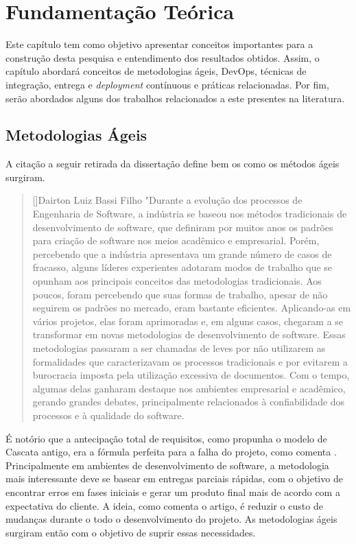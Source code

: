 \chapter{Fundamentação Teórica}

Este capítulo tem como objetivo apresentar conceitos importantes para a
construção desta pesquisa e entendimento dos resultados obtidos. Assim, o capítulo abordará conceitos de metodologias ágeis, DevOps, técnicas de integração, entrega e \emph{deployment} contínuous e práticas relacionadas. Por fim, serão abordados alguns dos trabalhos relacionados a este presentes na literatura.


\section{Metodologias Ágeis}

A citação a seguir retirada da dissertação \cite{experienciaComAgil} define bem os como os métodos ágeis surgiram.

    
\begin{quotation}[]{Dairton Luiz Bassi Filho}
    "Durante a evolução dos processos de Engenharia de Software, a
indústria se baseou nos métodos tradicionais de desenvolvimento de
software, que definiram por muitos anos os padrões para criação de
software nos meios acadêmico e empresarial. Porém, percebendo que a
indústria apresentava um grande número de casos de fracasso, alguns
líderes experientes adotaram modos de trabalho que se opunham aos
principais conceitos das metodologias tradicionais. Aos poucos, foram
percebendo que suas formas de trabalho, apesar de não seguirem os
padrões no mercado, eram bastante eficientes. Aplicando-as em vários 
projetos, elas foram aprimoradas e, em alguns casos, chegaram a se
transformar em novas metodologias de desenvolvimento de software.
Essas metodologias passaram a ser chamadas de leves por não
utilizarem as formalidades que caracterizavam os processos tradicionais
e por evitarem a burocracia imposta pela utilização excessiva de
documentos. Com o tempo, algumas delas ganharam destaque nos
ambientes empresarial e acadêmico, gerando grandes debates,
principalmente relacionados à confiabilidade dos processos e à
qualidade do software.
\end{quotation}

É notório que a antecipação total de requisitos, como propunha o modelo de Cascata antigo, era a fórmula perfeita para a falha do projeto, como comenta \cite{agileSoftwareDevelopment}. Principalmente em ambientes de desenvolvimento de software, a metodologia mais interessante deve se basear em entregas parciais rápidas, com o objetivo de encontrar erros em fases iniciais e gerar um produto final mais de acordo com a expectativa do cliente. A ideia, como comenta o artigo, é reduzir o custo de mudanças durante o todo o desenvolvimento do projeto. As metodologias ágeis surgiram então com o objetivo de suprir essas necessidades.

